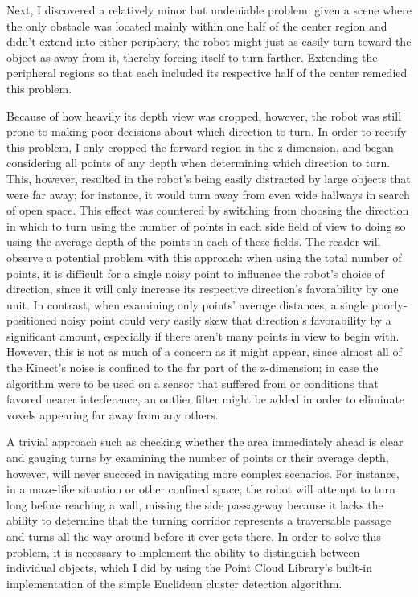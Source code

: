 \documentclass[12pt]{report}
\begin{document}
Next, I discovered a relatively minor but undeniable problem: given a scene where the only obstacle was located mainly within one half of the center region and didn't extend into either periphery, the robot might just as easily turn toward the object as away from it, thereby forcing itself to turn farther.  Extending the peripheral regions so that each included its respective half of the center remedied this problem.

Because of how heavily its depth view was cropped, however, the robot was still prone to making poor decisions about which direction to turn.  In order to rectify this problem, I only cropped the forward region in the z-dimension, and began considering all points of any depth when determining which direction to turn.  This, however, resulted in the robot's being easily distracted by large objects that were far away; for instance, it would turn away from even wide hallways in search of open space.  This effect was countered by switching from choosing the direction in which to turn using the number of points in each side field of view to doing so using the average depth of the points in each of these fields.  The reader will observe a potential problem with this approach: when using the total number of points, it is difficult for a single noisy point to influence the robot's choice of direction, since it will only increase its respective direction's favorability by one unit.  In contrast, when examining only points' average distances, a single poorly-positioned noisy point could very easily skew that direction's favorability by a significant amount, especially if there aren't many points in view to begin with.  However, this is not as much of a concern as it might appear, since almost all of the Kinect's noise is confined to the far part of the z-dimension; in case the algorithm were to be used on a sensor that suffered from or conditions that favored nearer interference, an outlier filter might be added in order to eliminate voxels appearing far away from any others.

A trivial approach such as checking whether the area immediately ahead is clear and gauging turns by examining the number of points or their average depth, however, will never succeed in navigating more complex scenarios.  For instance, in a maze-like situation or other confined space, the robot will attempt to turn long before reaching a wall, missing the side passageway because it lacks the ability to determine that the turning corridor represents a traversable passage and turns all the way around before it ever gets there.  In order to solve this problem, it is necessary to implement the ability to distinguish between individual objects, which I did by using the Point Cloud Library's built-in implementation of the simple Euclidean cluster detection algorithm.
\end{document}
